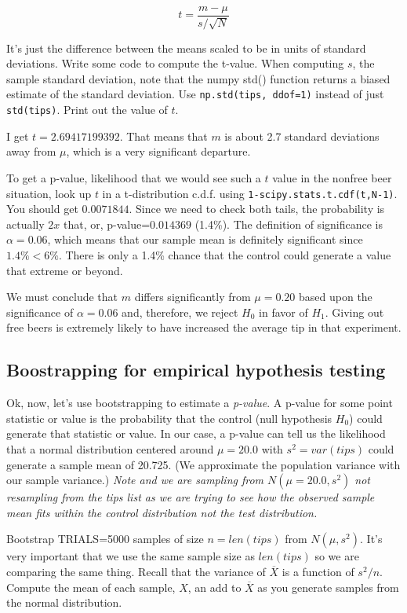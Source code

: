 \begin{fullwidth}
\[\tag{t-value}
t = \frac{m - \mu}{s / \sqrt{N}}
\]

\noindent It's just the difference between the means scaled to be in units of standard deviations.  Write some code to compute the t-value. When computing $s$, the sample standard deviation, note that the numpy std() function returns a biased estimate of the standard deviation. Use {\tt np.std(tips, ddof=1)} instead of just {\tt std(tips)}. Print out the value of $t$.

I get $t = 2.69417199392$. That means that $m$ is about 2.7 standard deviations away from $\mu$, which is a very significant departure. 

\step  To get a p-value, likelihood that we would see such a $t$ value in the nonfree beer situation, look up $t$ in a t-distribution c.d.f. using {\tt 1-scipy.stats.t.cdf(t,N-1)}. You should get $0.0071844$. Since we need to check both tails, the probability is actually $2x$ that, or, p-value=$0.014369$ (1.4\%). The definition of significance is $\alpha = 0.06$, which means that our sample mean is definitely significant since $1.4\% < 6\%$.  There is only a 1.4\% chance that the control could generate a value that extreme or beyond.

We must conclude that $m$ differs significantly from $\mu = 0.20$ based upon the significance of $\alpha=0.06$ and, therefore, we reject $H_0$ in favor of $H_1$.  Giving out free beers is extremely likely to have increased the average tip in that experiment.

\subsection{Boostrapping for empirical hypothesis testing}

\setcounter{problem}{1}

Ok, now, let's use bootstrapping to estimate a {\em p-value}. A p-value for some point statistic or value is the probability that the control (null hypothesis $H_0$) could generate that statistic or value. In our case, a p-value can tell us the likelihood that a normal distribution centered around $\mu=20.0$ with $s^2=var(tips)$ could generate a sample mean of 20.725. (We approximate the population variance with our sample variance.) {\em Note and we are sampling from $N(\mu=20.0,s^2)$ not resampling from the tips list as we are trying to see how the observed sample mean fits within the control distribution not the test distribution.}

\step Bootstrap TRIALS=5000 samples of size $n=len(tips)$ from $N(\mu, s^2)$. It's very important that we use the same sample size as $len(tips)$ so we are comparing the same thing. Recall that the variance of $\overline{X}$ is a function of $s^2/n$. Compute the mean of each sample, $X$, an add to $\overline{X}$ as you generate samples from the normal distribution.


\end{fullwidth}
